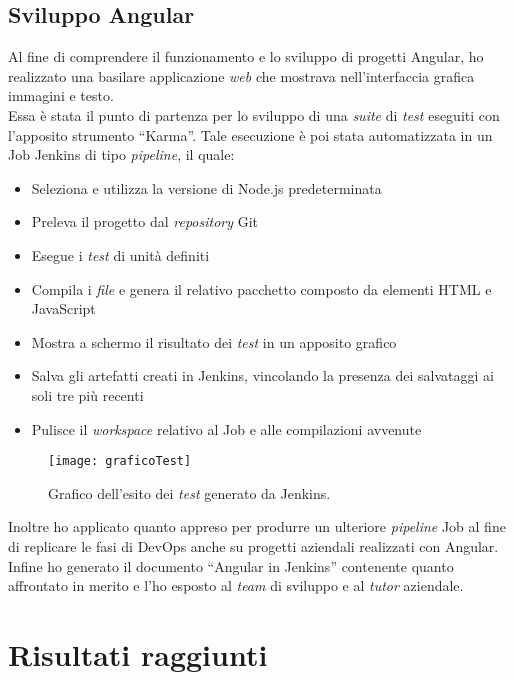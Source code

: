 \subsection{Sviluppo Angular}
Al fine di comprendere il funzionamento e lo sviluppo di progetti Angular, ho realizzato una basilare applicazione \emph{web} che mostrava nell'interfaccia grafica immagini e testo.\\
Essa è stata il punto di partenza per lo sviluppo di una \emph{suite} di \emph{test} eseguiti con l'apposito strumento “Karma”. Tale esecuzione è poi stata automatizzata in un Job Jenkins di tipo \emph{pipeline}, il quale: 
\begin{itemize}
    \item Seleziona e utilizza la versione di Node.js predeterminata
    \item Preleva il progetto dal \emph{repository} Git
    \item Esegue i \emph{test} di unità definiti
    \item Compila i \emph{file} e genera il relativo pacchetto composto da elementi HTML e JavaScript
    \item Mostra a schermo il risultato dei \emph{test} in un apposito grafico
    \item Salva gli artefatti creati in Jenkins, vincolando la presenza dei salvataggi ai soli tre più recenti
    \item Pulisce il \emph{workspace} relativo al Job e alle compilazioni avvenute  
\end{itemize}
\begin{figure}[htbp] 
    \centering 
    \texttt{[image: graficoTest]} 
    \caption{Grafico dell'esito dei \emph{test} generato da Jenkins.}
    \label{fig:graficoTest}
\end{figure}
Inoltre ho applicato quanto appreso per produrre un ulteriore \emph{pipeline} Job al fine di replicare le fasi di \gls{DevOps} anche su progetti aziendali realizzati con Angular.\\
Infine ho generato il documento “Angular in Jenkins” contenente quanto affrontato in merito e l'ho esposto al \emph{team} di sviluppo e al \emph{\emph{tutor}} aziendale. 

\section{Risultati raggiunti}
